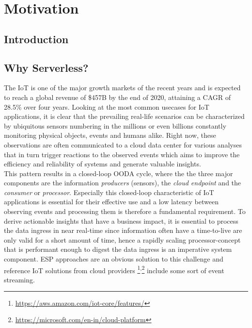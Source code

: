 \chapter{Motivation}


\section{Introduction}


\section{Why Serverless?}


The \acf{IoT} is one of the major growth markets of the recent years and is expected to reach a global revenue of \$457B by the end of 2020, attaining a \acf{CAGR} of 28.5\% over four years.\autocite{Columbus20172017Forecasts} Looking at the most common usecases for IoT applications, it is clear that the prevailing real-life scenarios can be characterized by ubiquitous sensors numbering in the millions or even billions constantly monitoring physical objects, events and humans alike. Right now, these observations are often communicated to a cloud data center for various analyses that in turn trigger reactions to the observed events which aims to improve the efficiency and reliability of systems and generate valuable insights.\autocite{Yannuzzi2014KeyComputing} \\
This pattern results in a closed-loop \acf{OODA} cycle, where the the three major components are the information \textit{producers} (sensors), the \textit{cloud endpoint} and the \textit{consumer} or \textit{processor}.\autocite{Shukla2017BenchmarkingApplications} Especially this closed-loop characteristic of IoT applications is essential for their effective use and a low latency between observing events and processing them is therefore a fundamental requirement. To derive actionable insights that have a business impact, it is essential to process the data ingress in near real-time since information often have a time-to-live are only valid for a short amount of time, hence a rapidly scaling processor-concept that is performant enough to digest the data ingress is an imperative system component. \acf{ESP} approaches are an obvious solution to this challenge and reference IoT solutions from cloud providers \footnote{\url{https://aws.amazon.com/iot-core/features/}}\textsuperscript{,}\footnote{\url{https://microsoft.com/en-in/cloud-platform}} include some sort of event streaming.


